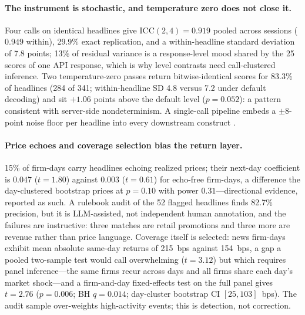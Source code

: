 \documentclass[11pt]{article}
\begin{document}
\paragraph{The instrument is stochastic, and temperature zero does not close it.}
Four calls on identical headlines give $\mathrm{ICC}(2,4)=0.919$ pooled across sessions ($0.949$ within), 29.9\% exact replication, and a within-headline standard deviation of 7.8 points; 13\% of residual variance is a response-level mood shared by the 25 scores of one API response, which is why level contrasts need call-clustered inference. Two temperature-zero passes return bitwise-identical scores for 83.3\% of headlines (284 of 341; within-headline SD 4.8 versus 7.2 under default decoding) and sit $+1.06$ points above the default level ($p=0.052$): a pattern consistent with server-side nondeterminism. A single-call pipeline embeds a $\pm8$-point noise floor per headline into every downstream construct \citep{herrera2025}.

\paragraph{Price echoes and coverage selection bias the return layer.}
15\% of firm-days carry headlines echoing realized prices; their next-day coefficient is $0.047$ ($t=1.80$) against $0.003$ ($t=0.61$) for echo-free firm-days, a difference the day-clustered bootstrap prices at $p=0.10$ with power $0.31$---directional evidence, reported as such. A rulebook audit of the 52 flagged headlines finds 82.7\% precision, but it is LLM-assisted, not independent human annotation, and the failures are instructive: three matches are retail promotions and three more are revenue rather than price language. Coverage itself is selected: news firm-days exhibit mean absolute same-day returns of 215~bps against 154~bps, a gap a pooled two-sample test would call overwhelming ($t=3.12$) but which requires panel inference---the same firms recur across days and all firms share each day's market shock---and a firm-and-day fixed-effects test on the full panel gives $t=2.76$ ($p=0.006$; BH $q=0.014$; day-cluster bootstrap CI $[25,103]$~bps). The audit sample over-weights high-activity events; this is detection, not correction.
\end{document}
